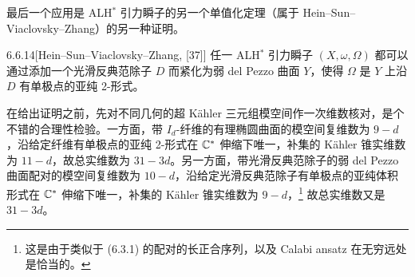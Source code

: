 最后一个应用是 ALH$^*$ 引力瞬子的另一个单值化定理（属于 Hein--Sun--Viaclovsky--Zhang）的另一种证明。
\begin{theorem}{6.6.14}[{Hein--Sun--Viaclovsky--Zhang, [37]}]
任一 ALH$^*$ 引力瞬子 $(X,\omega,\Omega)$ 都可以通过添加一个光滑反典范除子 $D$ 而紧化为弱 del Pezzo 曲面 $Y$，使得 $\Omega$ 是 $Y$ 上沿 $D$ 有单极点的亚纯 2-形式。
\end{theorem}

在给出证明之前，先对不同几何的超 Kähler 三元组模空间作一次维数核对，是个不错的合理性检验。一方面，带 $I_d$-纤维的有理椭圆曲面的模空间复维数为 $9-d$，沿给定纤维有单极点的亚纯 2-形式在 $\mathbb{C}^*$ 伸缩下唯一，补集的 Kähler 锥实维数为 $11-d$，故总实维数为 $31-3d$。另一方面，带光滑反典范除子的弱 del Pezzo 曲面配对的模空间复维数为 $10-d$，沿给定光滑反典范除子有单极点的亚纯体积形式在 $\mathbb{C}^*$ 伸缩下唯一，补集的 Kähler 锥实维数为 $9-d$，\footnote{这是由于类似于 (6.3.1) 的配对的长正合序列，以及 Calabi ansatz 在无穷远处是恰当的。} 故总实维数又是 $31-3d$。

